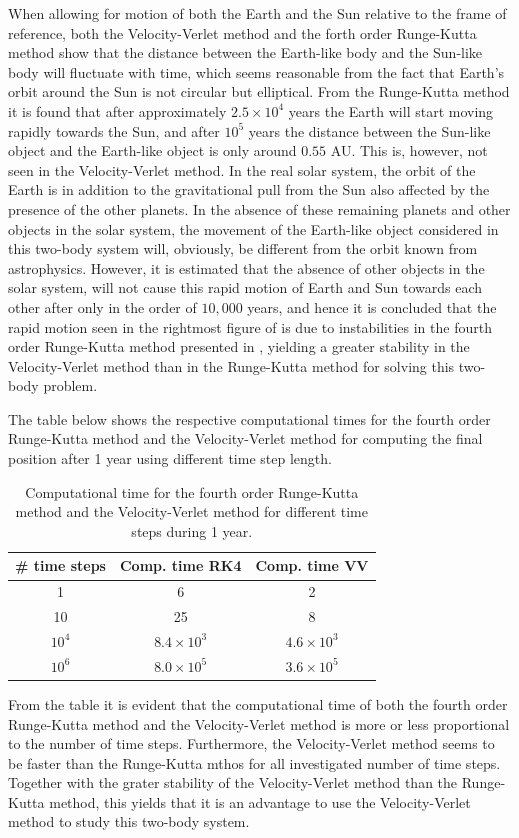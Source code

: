 When allowing for motion of both the Earth and the Sun relative to the frame of reference, both the Velocity-Verlet method and the forth order Runge-Kutta method show that the distance between the Earth-like body and the Sun-like body will fluctuate with time, which seems reasonable from the fact that Earth's orbit around the Sun is not circular but elliptical. 
From the Runge-Kutta method it is found that after approximately $2.5\times 10^4$ years the Earth will start moving rapidly towards the Sun, and after $10^5$ years the distance between the Sun-like object and the Earth-like object is only around $0.55$ AU. This is, however, not seen in the Velocity-Verlet method.
In the real solar system, the orbit of the Earth is in addition to the gravitational pull from the Sun also affected by the presence of the other planets. 
In the absence of these remaining planets and other objects in the solar system, the movement of the Earth-like object considered in this two-body system will, obviously, be different from the orbit known from astrophysics.
However, it is estimated that the absence of other objects in the solar system, will not cause this rapid motion of Earth and Sun towards each other after only in the order of $10,000$ years, and hence it is concluded that the rapid motion seen in the rightmost figure of  is due to instabilities in the fourth order Runge-Kutta method presented in , yielding a greater stability in the Velocity-Verlet method than in the Runge-Kutta method for solving this two-body problem.

The table below shows the respective computational times for the fourth order Runge-Kutta method and the Velocity-Verlet method for computing the final position after 1 year using different time step length. 
\begin{table}[H]
\centering
\caption{
Computational time for the fourth order Runge-Kutta method and the Velocity-Verlet method for different time steps during 1 year.
}
\begin{center}
\begin{tabular}{ | c | c | c | }
  \hline			
  \# time steps  & Comp. time RK4 & Comp. time VV  
  \\ \hline
  1 & 6 & 2
  \\ \hline
  10 & 25 & 8
  \\ \hline
  $10^4$ & $8.4\times 10^3$ & $4.6\times 10^3$
  \\ \hline
  $10^6$ & $8.0\times 10^5$ & $3.6\times 10^5$
  \\ \hline
\end{tabular}
\end{center}
\label{tab:SunEarthMarsTest2}
\end{table}
From the table it is evident that the computational time of both the fourth order Runge-Kutta method and the Velocity-Verlet method is more or less proportional to the number of time steps.
Furthermore, the Velocity-Verlet method seems to be faster than the Runge-Kutta mthos for all investigated number of time steps. 
Together with the grater stability of the Velocity-Verlet method than the Runge-Kutta method, this yields that it is an advantage to use the Velocity-Verlet method to study this two-body system.  